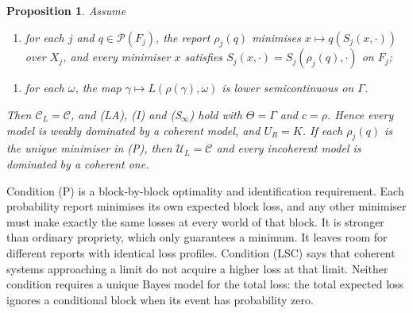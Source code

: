 \documentclass[11pt]{article}
\newtheorem{proposition}[theorem]{Proposition}
\theoremstyle{definition}
\theoremstyle{remark}
\newcommand{\C}{\mathcal C}
\newcommand{\U}{\mathcal U}
\newcommand{\PP}{\mathcal P}
\begin{document}
\begin{proposition}\label{prop:blocks}
Assume
\begin{enumerate}[label=\textbf{(P)},leftmargin=*]
\item for each $j$ and $q\in\PP(F_j)$, the report $\rho_j(q)$ minimises $x\mapsto q(S_j(x,\cdot))$ over $X_j$, and every minimiser $x$ satisfies $S_j(x,\cdot)=S_j(\rho_j(q),\cdot)$ on $F_j$;
\end{enumerate}
\begin{enumerate}[label=\textbf{(LSC)},leftmargin=*]
\item for each $\omega$, the map $\gamma\mapsto L(\rho(\gamma),\omega)$ is lower semicontinuous on $\Gamma$.
\end{enumerate}
Then $\C_L=\C$, and (LA), (I) and (S$_\infty$) hold with $\Theta=\Gamma$ and $c=\rho$. Hence every model is weakly dominated by a coherent model, and $U_R=K$. If each $\rho_j(q)$ is the \emph{unique} minimiser in (P), then $\U_L=\C$ and every incoherent model is dominated by a coherent one.
\end{proposition}

Condition (P) is a block-by-block optimality and identification requirement. Each probability report minimises its own expected block loss, and any other minimiser must make exactly the same losses at every world of that block. It is stronger than ordinary propriety, which only guarantees a minimum. It leaves room for different reports with identical loss profiles. Condition (LSC) says that coherent systems approaching a limit do not acquire a higher loss at that limit. Neither condition requires a unique Bayes model for the total loss: the total expected loss ignores a conditional block when its event has probability zero.
\end{document}
